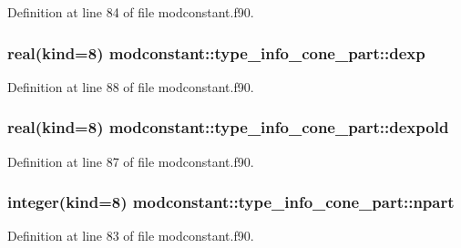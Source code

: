 Definition at line 84 of file modconstant.\-f90.

\hypertarget{structmodconstant_1_1type__info__cone__part_a385288d5451a9e5a796cd95703c64123}{
\subsubsection[{dexp}]{\setlength{\rightskip}{0pt plus 5cm}real(kind=8) modconstant\-::type\-\_\-info\-\_\-cone\-\_\-part\-::dexp}}\label{structmodconstant_1_1type__info__cone__part_a385288d5451a9e5a796cd95703c64123}


Definition at line 88 of file modconstant.\-f90.

\hypertarget{structmodconstant_1_1type__info__cone__part_a31961ed81e5aac15547157376f406298}{
\subsubsection[{dexpold}]{\setlength{\rightskip}{0pt plus 5cm}real(kind=8) modconstant\-::type\-\_\-info\-\_\-cone\-\_\-part\-::dexpold}}\label{structmodconstant_1_1type__info__cone__part_a31961ed81e5aac15547157376f406298}


Definition at line 87 of file modconstant.\-f90.

\hypertarget{structmodconstant_1_1type__info__cone__part_a73d3e6327f56d23694d86bd5167602d6}{
\subsubsection[{npart}]{\setlength{\rightskip}{0pt plus 5cm}integer(kind=8) modconstant\-::type\-\_\-info\-\_\-cone\-\_\-part\-::npart}}\label{structmodconstant_1_1type__info__cone__part_a73d3e6327f56d23694d86bd5167602d6}


Definition at line 83 of file modconstant.\-f90.

